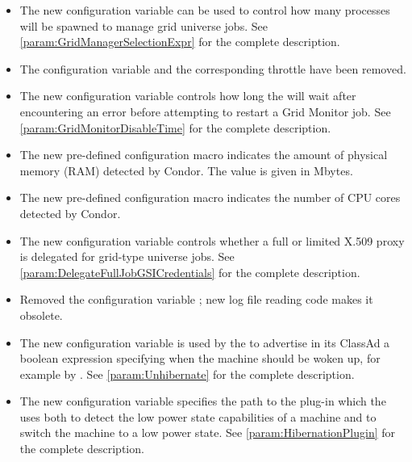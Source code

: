 \begin{itemize}
\item The new configuration variable 
can be used to control how many  processes will be
spawned to manage grid universe jobs. 
See \ref{param:GridManagerSelectionExpr} for the complete description.

\item The configuration variable
 and the
corresponding throttle 
have been removed.

\item The new configuration variable 
controls how long the  will wait after encountering
an error before attempting to restart a Grid Monitor job.
See \ref{param:GridMonitorDisableTime} for the complete description.

\item The new pre-defined configuration macro 
indicates the amount of physical memory (RAM) detected by Condor.
The value is given in Mbytes.

\item The new pre-defined configuration macro 
indicates the number of CPU cores detected by Condor.

\item The new configuration variable
controls whether a full or limited X.509 proxy is delegated for grid-type
  universe jobs.
See \ref{param:DelegateFullJobGSICredentials}
for the complete description.

\item Removed the configuration variable
; new log file reading code makes it
obsolete.

\item The new configuration variable  is used by
the  to advertise in its ClassAd a boolean expression
specifying when the machine should be woken up, 
for example by .
See \ref{param:Unhibernate} for the complete description.

\item The new configuration variable  specifies the
  path to the plug-in which the  uses both to detect
  the low power state capabilities of a machine and to switch the
  machine to a low power state.
  See \ref{param:HibernationPlugin} for the complete description.


\end{itemize}
